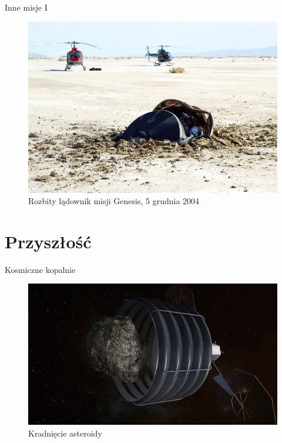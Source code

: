 \documentclass{beamer}
\begin{document}
\begin{frame}{Inne misje I}
    \begin{figure}
        \centering
        \includegraphics[width=0.75\linewidth]{kosmos/genesis.png}
        \caption{Rozbity lądownik misji Genesis, 5 grudnia 2004}
    \end{figure}
\end{frame}


\section{Przyszłość}
\begin{frame}{Kosmiczne kopalnie}
   \begin{figure}
        \centering
        \includegraphics[width=0.75\linewidth]{kosmos/zuodziej.png}
        \caption{Kradnięcie asteroidy}
    \end{figure} 
\end{frame}
\end{document}
